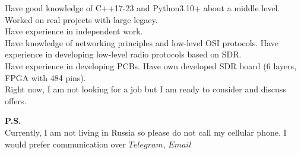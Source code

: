 

\begin{cvparagraph}


\begin{flushleft}
    Have good knowledge of C++17-23 and Python3.10+ about a middle level.\\
    Worked on real projects with large legacy.\\
    Have experience in independent work.\\
    Have knowledge of networking principles and low-level OSI protocols. Have experience in developing low-level radio protocols based on SDR.\\
    Have experience in developing PCBs. Have own developed SDR board (6 layers, FPGA with 484 pins).\\
    Right now, I am not looking for a job but I am ready to consider and discuss offers.\\
\end{flushleft}
\begin{flushleft}
    \textbf{P.S.}\\
    Currently, I am not living in Russia so please do not call my cellular phone. I would prefer communication over $Telegram$, $Email$
\end{flushleft}
\end{cvparagraph}